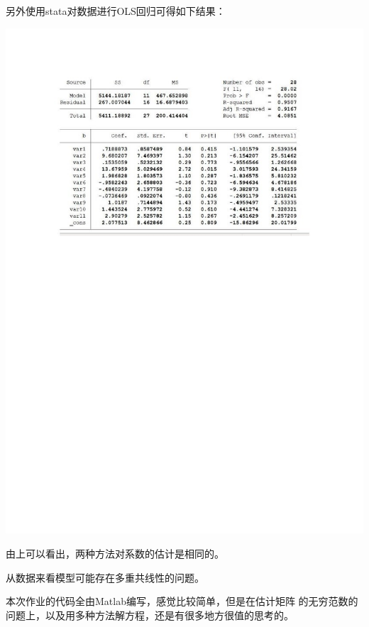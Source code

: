\documentclass{ctexart}
\begin{document}
另外使用stata对数据进行OLS回归可得如下结果：
\par
\centerline{\includegraphics{5.jpg}}
\par
由上可以看出，两种方法对系数的估计是相同的。

从数据来看模型可能存在多重共线性的问题。

本次作业的代码全由Matlab编写，感觉比较简单，但是在估计矩阵
的无穷范数的问题上，以及用多种方法解方程，还是有很多地方很值的思考的。
\end{document}
